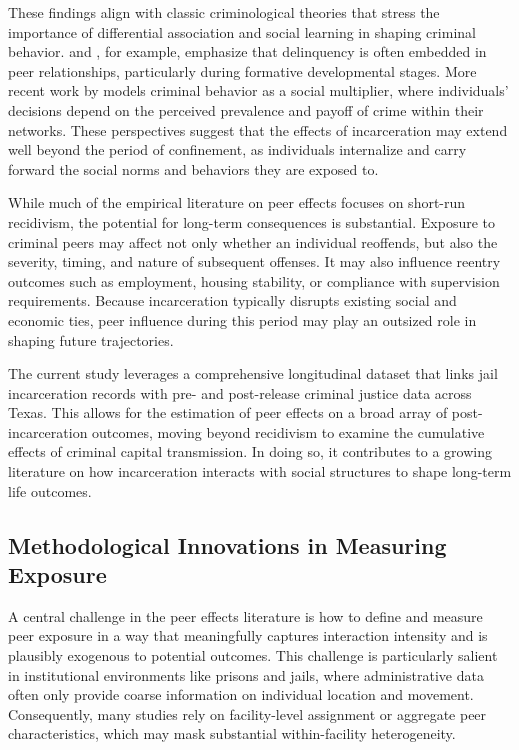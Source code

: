 \documentclass[12pt, a4paper]{article}
\begin{document}
These findings align with classic criminological theories that stress the importance of differential association and social learning in shaping criminal behavior. \citet{glueck1950unraveling} and \citet{warr1991breaking}, for example, emphasize that delinquency is often embedded in peer relationships, particularly during formative developmental stages. More recent work by \citet{glaeser1996crime} models criminal behavior as a social multiplier, where individuals’ decisions depend on the perceived prevalence and payoff of crime within their networks. These perspectives suggest that the effects of incarceration may extend well beyond the period of confinement, as individuals internalize and carry forward the social norms and behaviors they are exposed to.

While much of the empirical literature on peer effects focuses on short-run recidivism, the potential for long-term consequences is substantial. Exposure to criminal peers may affect not only whether an individual reoffends, but also the severity, timing, and nature of subsequent offenses. It may also influence reentry outcomes such as employment, housing stability, or compliance with supervision requirements. Because incarceration typically disrupts existing social and economic ties, peer influence during this period may play an outsized role in shaping future trajectories.

The current study leverages a comprehensive longitudinal dataset that links jail incarceration records with pre- and post-release criminal justice data across Texas. This allows for the estimation of peer effects on a broad array of post-incarceration outcomes, moving beyond recidivism to examine the cumulative effects of criminal capital transmission. In doing so, it contributes to a growing literature on how incarceration interacts with social structures to shape long-term life outcomes.

\subsection{Methodological Innovations in Measuring Exposure}

A central challenge in the peer effects literature is how to define and measure peer exposure in a way that meaningfully captures interaction intensity and is plausibly exogenous to potential outcomes. This challenge is particularly salient in institutional environments like prisons and jails, where administrative data often only provide coarse information on individual location and movement. Consequently, many studies rely on facility-level assignment or aggregate peer characteristics, which may mask substantial within-facility heterogeneity.
\end{document}
